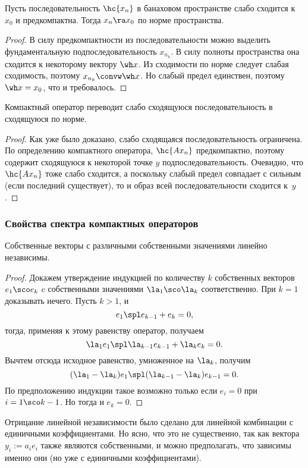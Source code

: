\documentclass[a4paper]{article}
\begin{document}
\begin{lemma}
Пусть последовательность $\hc{x_n}$ в банаховом пространстве
слабо сходится к $x_0$ и предкомпактна. Тогда $x_n \ra x_0$ по норме пространства.
\end{lemma}
\begin{proof}
В силу предкомпактности из последовательности можно выделить фундаментальную подпоследовательность $x_{n_k}$.
В силу полноты пространства она сходится к некоторому вектору $\wh x$. Из сходимости
по норме следует слабая сходимость, поэтому $x_{n_k} \convw \wh x$.
Но слабый предел единствен, поэтому $\wh x = x_0$, что и требовалось.
\end{proof}

\begin{imp}
Компактный оператор переводит слабо сходящуюся последовательность в сходящуюся по норме.
\end{imp}
\begin{proof}
Как уже было доказано, слабо сходящаяся последовательность ограничена.
По определению компактного оператора, $\hc{A x_n}$ предкомпактно,
поэтому содержит сходящуюся к некоторой точке $y$ подпоследовательность. Очевидно, что $\hc{Ax_n}$
тоже слабо сходится, а поскольку слабый предел совпадает с сильным (если последний существует),
то и образ всей последовательности сходится к~$y$.
\end{proof}

\subsubsection{Свойства спектра компактных операторов}

\begin{lemma}
Собственные векторы с различными собственными значениями линейно независимы.
\end{lemma}
\begin{proof}
Докажем утверждение индукцией по количеству $k$ собственных векторов $e_1\sco e_k$ c собственными
значениями $\la_1\sco \la_k$ соответственно. При $k = 1$ доказывать нечего.
Пусть $k > 1$, и
$$e_1\spl e_{k-1} + e_k = 0,$$
тогда, применяя к этому равенству оператор, получаем
$$\la_1e_1\spl \la_{k-1}e_{k-1} + \la_k e_k = 0.$$
Вычтем отсюда исходное равенство, умноженное на $\la_k$, получим
$$(\la_1-\la_k)e_1\spl (\la_{k-1}-\la_k)e_{k-1} = 0.$$
По предположению индукции такое возможно только если
$e_i = 0$ при $i = 1\sco k-1$. Но тогда и $e_k = 0$.
\end{proof}

\begin{note}
Отрицание линейной независимости было сделано для линейной комбинации с единичными
коэффициентами. Но ясно, что это не существенно, так как вектора $y_i := a_i e_i$ также являются
собственными, и можно предполагать, что зависимы именно они (но уже с единичными коэффициентами).
\end{note}
\end{document}

